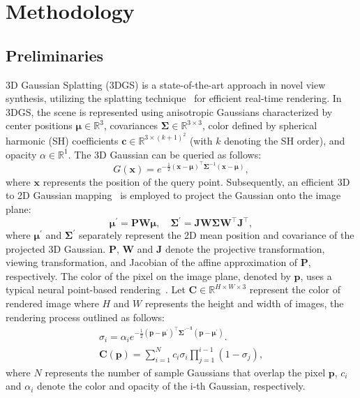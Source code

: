 \documentclass[conference]{IEEEtran}
\begin{document}
\section{Methodology}
\subsection{Preliminaries}

3D Gaussian Splatting (3DGS) is a state-of-the-art approach in novel view synthesis, utilizing the splatting technique~\cite{yifan2019differentiable} for efficient real-time rendering. In 3DGS, the scene is represented using anisotropic Gaussians characterized by center positions $\boldsymbol{\mu} \in \mathbb{R}^3$, covariances $\mathbf{\Sigma} \in \mathbb{R}^{3\times3}$, color defined by spherical harmonic (SH) coefficients $\boldsymbol{c} \in \mathbb{R}^{3\times (k+1)^2}$ (with $k$ denoting the SH order), and opacity $\alpha \in \mathbb{R}^1$. The 3D Gaussian can be queried as follows:
\begin{equation}
	\label{eq: gaussian}
	G(\mathbf{x})=e^{-\frac{1}{2}(\mathbf{x}-\boldsymbol{\mu})^{\top}\mathbf{\Sigma}^{-1}(\mathbf{x}-\boldsymbol{\mu})},
\end{equation}
where $\mathbf{x}$ represents the position of the query point. Subsequently, an efficient 3D to 2D Gaussian mapping~\cite{zwicker2001ewa} is employed to project the Gaussian onto the image plane:
\begin{equation}
	\boldsymbol{\mu}^{\prime}={\mathbf{P}\mathbf{W}\boldsymbol{\mu}}, 
\quad
	\mathbf{{\Sigma}^{\prime}}=\mathbf{J}\mathbf{W} \mathbf{\Sigma} \mathbf{W^{\top}}\mathbf{J^{\top}},
\end{equation}
where $\boldsymbol{\mu}^{\prime}$ and $\mathbf{{\Sigma}^{\prime}}$ separately represent the 2D mean position and covariance of the projected 3D Gaussian. $\mathbf{P}$, $\mathbf{W}$ and $\mathbf{J}$ denote the projective transformation, viewing transformation, and Jacobian of the affine approximation of $\mathbf{P}$, respectively. 
The color of the pixel on the image plane, denoted by $\mathbf{p}$, uses a typical neural point-based rendering~\cite{kopanas2022neural,KPLD21}. Let  $\mathbf{C} \in \mathbb{R}^{H\times W\times3}$ represent the color of rendered image where $H$ and $W$ represents the height and width of images, the rendering process outlined as follows:
\begin{equation}
\begin{split}
    \sigma_i=\alpha_ie^{-\frac12(\mathbf{p}-\boldsymbol{\mu}^{\prime})^{\top}\mathbf{{{\Sigma}^{\prime}}^{-1}}(\mathbf{p}-\boldsymbol{\mu}^{\prime})}.
    \\
	{\mathbf{C}(\mathbf{p})} = {\sum_{i=1}^{N}
	c_{i}\sigma_{i}
	\prod_{j=1}^{i-1}(1-\sigma_{j})},
\label{eq_render}
\end{split}
\end{equation}
where $N$ represents the number of sample Gaussians that overlap the pixel $\mathbf{p}$,   $c_{i}$ and $\alpha_{i}$ denote the color and opacity of the i-th Gaussian, respectively.
\end{document}
